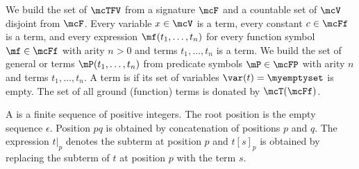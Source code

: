 \begin{definition}
We build the set of  $\mcTFV$
from a signature $\mcF$ and
a countable set of  $\mcV$ disjoint from $\mcF$.
Every variable $x\in\mcV$ is a term,
every constant $c\in\mcFf$ is a term, and
every expression $\mf(t_1,\ldots,t_n)$
for every function symbol $\mf\in\mcFf$ with arity $n>0$
and terms $t_1,\ldots,t_n$
is a term.
%
We build the set of general or  terms $\mP(t_1,\ldots,t_n)$ from
predicate symbols $\mP\in\mcFP$ with arity $n$ and terms $t_1,\ldots,t_n$.
%
A term is  if its set of variables $\var(t)=\myemptyset$ is empty.
The set of all ground (function) terms is donated by $\mcT(\mcFf)$.
\end{definition}

%
\begin{definition}\label{def:position}
A  is a finite sequence of positive integers.
The root position is the empty sequence $\epsilon$.
Position $pq$ is obtained by concatenation of positions $p$ and $q$.
%
The expression $t|_p$ denotes the subterm at position $p$
and $t[s]_p$ is obtained by replacing the subterm of $t$ at position $p$ with the term $s$.
%
\end{definition}
